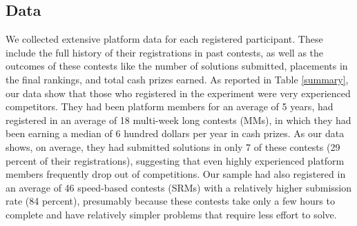 \documentclass[10pt, titlepage]{article}
\begin{document}
\subsection{Data}\label{data}

We collected extensive platform data for each registered participant.
These include the full history of their registrations in past contests,
as well as the outcomes of these contests like the number of solutions
submitted, placements in the final rankings, and total cash prizes
earned. As reported in Table \ref{summary}, our data show that those who
registered in the experiment were very experienced competitors. They had
been platform members for an average of 5 years, had registered in an
average of 18 multi-week long contests (MMs), in which they had been
earning a median of 6 hundred dollars per year in cash prizes. As our
data shows, on average, they had submitted solutions in only 7 of these
contests (29 percent of their registrations), suggesting that even
highly experienced platform members frequently drop out of competitions.
Our sample had also registered in an average of 46 speed-based contests
(SRMs) with a relatively higher submission rate (84 percent), presumably
because these contests take only a few hours to complete and have
relatively simpler problems that require less effort to solve.
\end{document}
